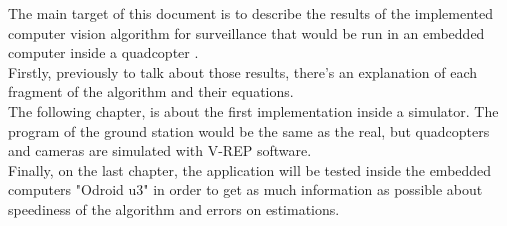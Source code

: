 	The main target of this document is to describe the results of the implemented computer vision algorithm for surveillance that would be run in an embedded computer inside a quadcopter \cite{Image_processing_UAV}.  \\
	
	Firstly, previously to talk about those results, there's an explanation of each fragment of the algorithm and their equations. \\
	The following chapter, is about the first implementation inside a simulator. The program of the ground station would be the same as the real, but quadcopters and cameras are simulated with V-REP software. \\
	Finally, on the last chapter, the application will be tested inside the embedded computers "Odroid u3" in order to get as much information as possible about speediness of the  algorithm and errors on estimations.